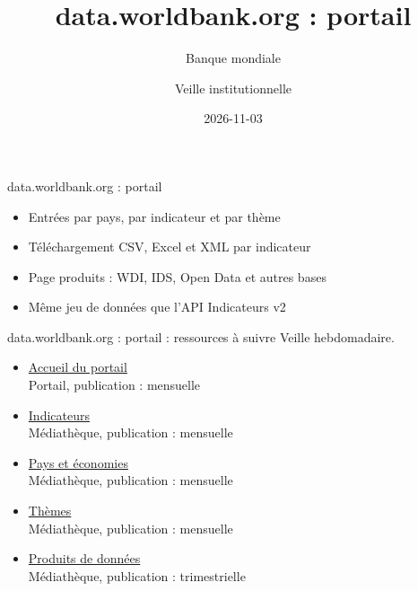 \documentclass[aspectratio=169,11pt]{beamer}
\title{data.worldbank.org : portail}
\subtitle{Banque mondiale}
\author{Veille institutionnelle}
\date{2026-11-03}
\begin{document}
\begin{frame}\titlepage\end{frame}

\begin{frame}{data.worldbank.org : portail}
\begin{itemize}
\item Entrées par pays, par indicateur et par thème
\item Téléchargement CSV, Excel et XML par indicateur
\item Page produits : WDI, IDS, Open Data et autres bases
\item Même jeu de données que l'API Indicateurs v2
\end{itemize}
\end{frame}

\begin{frame}{data.worldbank.org : portail : ressources à suivre}
\small
Veille hebdomadaire.
\begin{itemize}
\item \href{https://data.worldbank.org}{Accueil du portail}\\{\footnotesize Portail, publication : mensuelle}
\item \href{https://data.worldbank.org/indicator}{Indicateurs}\\{\footnotesize Médiathèque, publication : mensuelle}
\item \href{https://data.worldbank.org/country}{Pays et économies}\\{\footnotesize Médiathèque, publication : mensuelle}
\item \href{https://data.worldbank.org/topic}{Thèmes}\\{\footnotesize Médiathèque, publication : mensuelle}
\item \href{https://data.worldbank.org/products}{Produits de données}\\{\footnotesize Médiathèque, publication : trimestrielle}
\end{itemize}
\end{frame}
\end{document}
